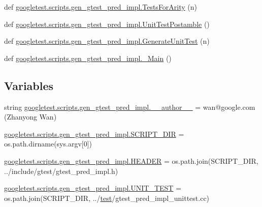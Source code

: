 \begin{DoxyCompactItemize}
\item 
def \mbox{\hyperlink{namespacegoogletest_1_1scripts_1_1gen__gtest__pred__impl_ab79fc4240cc9581f0c71f2f088d18292}{googletest.\+scripts.\+gen\+\_\+gtest\+\_\+pred\+\_\+impl.\+Tests\+For\+Arity}} (n)
\item 
def \mbox{\hyperlink{namespacegoogletest_1_1scripts_1_1gen__gtest__pred__impl_a4c934c79a2247479224b01389fcd42bd}{googletest.\+scripts.\+gen\+\_\+gtest\+\_\+pred\+\_\+impl.\+Unit\+Test\+Postamble}} ()
\item 
def \mbox{\hyperlink{namespacegoogletest_1_1scripts_1_1gen__gtest__pred__impl_a67e3a1a91ac339842cc74d50f4692891}{googletest.\+scripts.\+gen\+\_\+gtest\+\_\+pred\+\_\+impl.\+Generate\+Unit\+Test}} (n)
\item 
def \mbox{\hyperlink{namespacegoogletest_1_1scripts_1_1gen__gtest__pred__impl_a1a2a54c1392ab53994303c43ba0ee9d3}{googletest.\+scripts.\+gen\+\_\+gtest\+\_\+pred\+\_\+impl.\+\_\+\+Main}} ()
\end{DoxyCompactItemize}
\subsection*{Variables}
\begin{DoxyCompactItemize}
\item 
string \mbox{\hyperlink{namespacegoogletest_1_1scripts_1_1gen__gtest__pred__impl_ad288b3a1d70e0ce7487d6f1b146d1b73}{googletest.\+scripts.\+gen\+\_\+gtest\+\_\+pred\+\_\+impl.\+\_\+\+\_\+author\+\_\+\+\_\+}} = \textquotesingle{}wan@google.\+com (Zhanyong Wan)\textquotesingle{}
\item 
\mbox{\hyperlink{namespacegoogletest_1_1scripts_1_1gen__gtest__pred__impl_a5c80a5c6472115a9c5b15f18254df8cd}{googletest.\+scripts.\+gen\+\_\+gtest\+\_\+pred\+\_\+impl.\+S\+C\+R\+I\+P\+T\+\_\+\+D\+IR}} = os.\+path.\+dirname(sys.\+argv\mbox{[}0\mbox{]})
\item 
\mbox{\hyperlink{namespacegoogletest_1_1scripts_1_1gen__gtest__pred__impl_a1f90e2c67827c45c51d0fece1322b13c}{googletest.\+scripts.\+gen\+\_\+gtest\+\_\+pred\+\_\+impl.\+H\+E\+A\+D\+ER}} = os.\+path.\+join(S\+C\+R\+I\+P\+T\+\_\+\+D\+IR, \textquotesingle{}../include/gtest/gtest\+\_\+pred\+\_\+impl.\+h\textquotesingle{})
\item 
\mbox{\hyperlink{namespacegoogletest_1_1scripts_1_1gen__gtest__pred__impl_aae5f18b95e40b267265d18f1c6b792ce}{googletest.\+scripts.\+gen\+\_\+gtest\+\_\+pred\+\_\+impl.\+U\+N\+I\+T\+\_\+\+T\+E\+ST}} = os.\+path.\+join(S\+C\+R\+I\+P\+T\+\_\+\+D\+IR, \textquotesingle{}../\mbox{\hyperlink{_mutual_8h_a707ee03719e99670bf6cfdfd897b8456}{test}}/gtest\+\_\+pred\+\_\+impl\+\_\+unittest.\+cc\textquotesingle{})
\end{DoxyCompactItemize}
